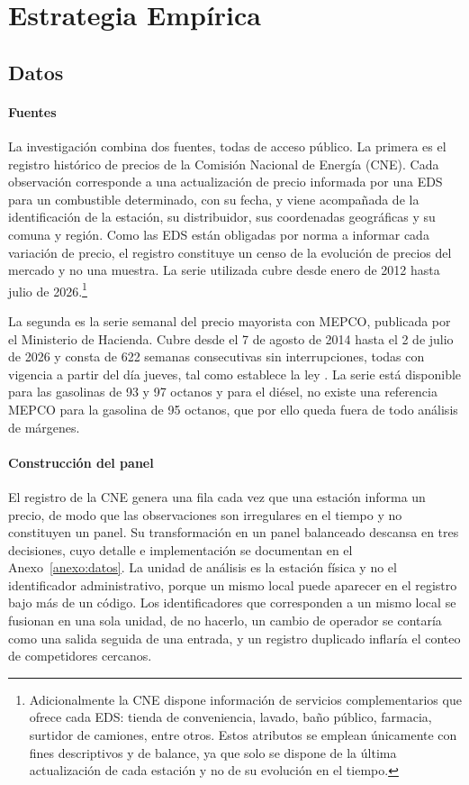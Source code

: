 \section{Estrategia Empírica}

\subsection{Datos}

\paragraph{Fuentes}

La investigación combina dos fuentes, todas de acceso público. La primera es el registro histórico de precios de la Comisión Nacional de Energía (CNE). Cada observación corresponde a una actualización de precio informada por una EDS para un combustible determinado, con su fecha, y viene acompañada de la identificación de la estación, su distribuidor, sus coordenadas geográficas y su comuna y región. Como las EDS están obligadas por norma a informar cada variación de precio, el registro constituye un censo de la evolución de precios del mercado y no una muestra. La serie utilizada cubre desde enero de 2012 hasta julio de 2026.\footnote{Adicionalmente la CNE dispone información de servicios complementarios que ofrece cada EDS: tienda de conveniencia, lavado, baño público, farmacia, surtidor de camiones, entre otros. Estos atributos se emplean únicamente con fines descriptivos y de balance, ya que solo se dispone de la última actualización de cada estación y no de su evolución en el tiempo.}

La segunda es la serie semanal del precio mayorista con MEPCO, publicada por el Ministerio de Hacienda. Cubre desde el 7 de agosto de 2014 hasta el 2 de julio de 2026 y consta de 622 semanas consecutivas sin interrupciones, todas con vigencia a partir del día jueves, tal como establece la ley \parencite{LEY20765}. La serie está disponible para las gasolinas de 93 y 97 octanos y para el diésel, no existe una referencia MEPCO para la gasolina de 95 octanos, que por ello queda fuera de todo análisis de márgenes.

\paragraph{Construcción del panel}

El registro de la CNE genera una fila cada vez que una estación informa un precio, de modo que las observaciones son irregulares en el tiempo y no constituyen un panel. Su transformación en un panel balanceado descansa en tres decisiones, cuyo detalle e implementación se documentan en el Anexo~\ref{anexo:datos}. La unidad de análisis es la estación física y no el identificador administrativo, porque un mismo local puede aparecer en el registro bajo más de un código. Los identificadores que corresponden a un mismo local se fusionan en una sola unidad, de no hacerlo, un cambio de operador se contaría como una salida seguida de una entrada, y un registro duplicado inflaría el conteo de competidores cercanos.

